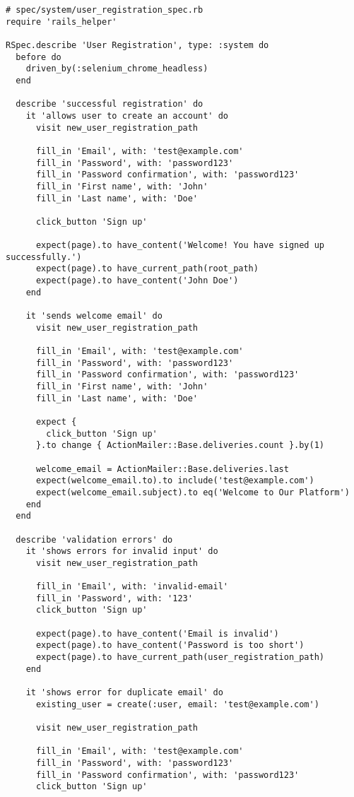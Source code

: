 \documentclass[12pt,a4paper]{article}
\begin{document}
\begin{lstlisting}
# spec/system/user_registration_spec.rb
require 'rails_helper'

RSpec.describe 'User Registration', type: :system do
  before do
    driven_by(:selenium_chrome_headless)
  end

  describe 'successful registration' do
    it 'allows user to create an account' do
      visit new_user_registration_path

      fill_in 'Email', with: 'test@example.com'
      fill_in 'Password', with: 'password123'
      fill_in 'Password confirmation', with: 'password123'
      fill_in 'First name', with: 'John'
      fill_in 'Last name', with: 'Doe'

      click_button 'Sign up'

      expect(page).to have_content('Welcome! You have signed up successfully.')
      expect(page).to have_current_path(root_path)
      expect(page).to have_content('John Doe')
    end

    it 'sends welcome email' do
      visit new_user_registration_path

      fill_in 'Email', with: 'test@example.com'
      fill_in 'Password', with: 'password123'
      fill_in 'Password confirmation', with: 'password123'
      fill_in 'First name', with: 'John'
      fill_in 'Last name', with: 'Doe'

      expect {
        click_button 'Sign up'
      }.to change { ActionMailer::Base.deliveries.count }.by(1)

      welcome_email = ActionMailer::Base.deliveries.last
      expect(welcome_email.to).to include('test@example.com')
      expect(welcome_email.subject).to eq('Welcome to Our Platform')
    end
  end

  describe 'validation errors' do
    it 'shows errors for invalid input' do
      visit new_user_registration_path

      fill_in 'Email', with: 'invalid-email'
      fill_in 'Password', with: '123'
      click_button 'Sign up'

      expect(page).to have_content('Email is invalid')
      expect(page).to have_content('Password is too short')
      expect(page).to have_current_path(user_registration_path)
    end

    it 'shows error for duplicate email' do
      existing_user = create(:user, email: 'test@example.com')

      visit new_user_registration_path

      fill_in 'Email', with: 'test@example.com'
      fill_in 'Password', with: 'password123'
      fill_in 'Password confirmation', with: 'password123'
      click_button 'Sign up'


\end{lstlisting}
\end{document}
